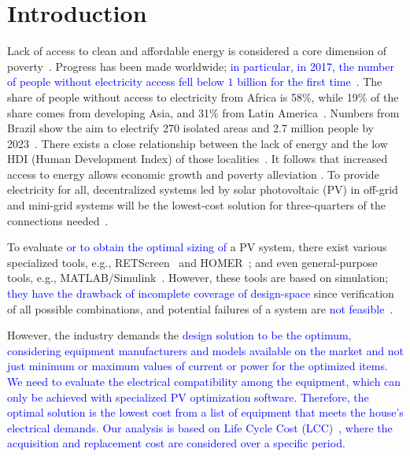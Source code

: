\documentclass[runningheads]{llncs}
\begin{document}
\section{Introduction}

Lack of access to clean and affordable energy is considered a core dimension of poverty~\cite{Hussein2012}. Progress has been made worldwide; \textcolor{blue}{in particular, in 2017, the number of people without electricity access fell below $1$ billion for the first time}~\cite{IEAweo2018}. The share of people without access to electricity from Africa is 58\%, while 19\% of the share comes from developing Asia, and 31\% from Latin America~\cite{IEAweo2018}. Numbers from Brazil show the aim to electrify 270 isolated areas and 2.7 million people by 2023~\cite{EPE2018}. 
There exists a close relationship between the lack of energy and the low HDI (Human Development Index) of those localities~\cite{Coelho}. It follows that increased access to energy allows economic growth and poverty alleviation \cite{Karekesi}. To provide electricity for all, decentralized systems led by solar photovoltaic (PV) in off-grid and mini-grid systems will be the lowest-cost solution for three-quarters of the connections needed~\cite{Hussein2012}. 

To evaluate \textcolor{blue}{or to obtain the optimal sizing of} a PV system, there exist various specialized tools, e.g., RETScreen~\cite{Pradhan} and HOMER~\cite{Swarnkar}; and even general-purpose tools, e.g., MATLAB/Simulink~\cite{Gow1999}. However, these tools are based on simulation; \textcolor{blue}{they have the drawback of incomplete coverage of design-space} since verification of all possible combinations, and potential failures of a system are \textcolor{blue}{not feasible}~\cite{ClarkeHV18}. 

However, the industry demands the \textcolor{blue}{design solution to be the optimum, considering equipment manufacturers and models available on the market and not just minimum or maximum values of current or power for the optimized items. We need to evaluate the electrical compatibility among the equipment, which can only be achieved with specialized PV optimization software. Therefore, the optimal solution is the lowest cost from a list of equipment that meets the house's electrical demands. Our analysis is based on Life Cycle Cost (LCC)~\cite{Alsadi2018}, where the acquisition and replacement cost are considered over a specific period.}
\end{document}
